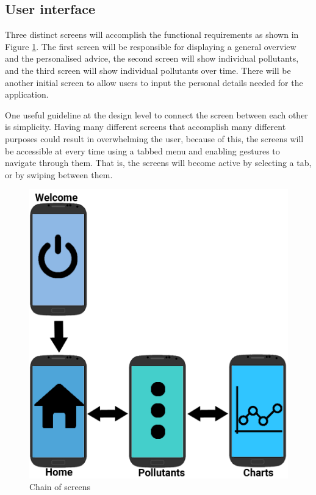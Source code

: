\subsection{User interface}
Three distinct screens will accomplish the functional requirements as shown in Figure \ref{fig:chain_of_screens}. The first screen will be responsible for displaying a general overview and the personalised advice, the second screen will show individual pollutants, and the third screen will show individual pollutants over time. There will be another initial screen to allow users to input the personal details needed for the application.

One useful guideline at the design level to connect the screen between each other is simplicity. Having many different screens that accomplish many different purposes could result in overwhelming the user, because of this, the screens will be accessible at every time using a tabbed menu and enabling gestures to navigate through them. That is, the screens will become active by selecting a tab, or by swiping between them.

\begin{figure}[H]
\begin{adjustbox}{width=.45\textwidth,center=\textwidth}
  \centering
  \includegraphics[scale=1]{images/screenChain.png}
\end{adjustbox}
  \caption[Chain of screens]{Chain of screens}
  \label{fig:chain_of_screens}
\end{figure}

